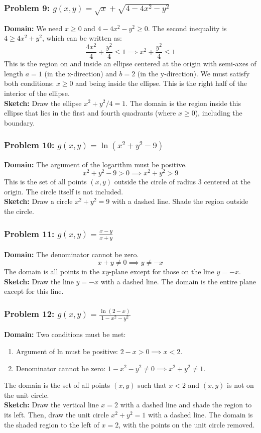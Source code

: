 \documentclass{article}
\begin{document}
\subsubsection{Problem 9: $g(x, y) = \sqrt{x} + \sqrt{4 - 4x^2 - y^2}$}
\textbf{Domain:} We need $x \ge 0$ and $4 - 4x^2 - y^2 \ge 0$.
The second inequality is $4 \ge 4x^2 + y^2$, which can be written as:
\[ \frac{4x^2}{4} + \frac{y^2}{4} \le 1 \implies x^2 + \frac{y^2}{4} \le 1 \]
This is the region on and inside an ellipse centered at the origin with semi-axes of length $a=1$ (in the x-direction) and $b=2$ (in the y-direction).
We must satisfy both conditions: $x \ge 0$ and being inside the ellipse. This is the right half of the interior of the ellipse. \\
\textbf{Sketch:} Draw the ellipse $x^2 + y^2/4 = 1$. The domain is the region inside this ellipse that lies in the first and fourth quadrants (where $x \ge 0$), including the boundary.

\subsubsection{Problem 10: $g(x, y) = \ln(x^2 + y^2 - 9)$}
\textbf{Domain:} The argument of the logarithm must be positive.
\[ x^2 + y^2 - 9 > 0 \implies x^2 + y^2 > 9 \]
This is the set of all points $(x, y)$ outside the circle of radius 3 centered at the origin. The circle itself is not included. \\
\textbf{Sketch:} Draw a circle $x^2+y^2=9$ with a dashed line. Shade the region outside the circle.

\subsubsection{Problem 11: $g(x, y) = \frac{x-y}{x+y}$}
\textbf{Domain:} The denominator cannot be zero.
\[ x + y \neq 0 \implies y \neq -x \]
The domain is all points in the $xy$-plane except for those on the line $y = -x$. \\
\textbf{Sketch:} Draw the line $y = -x$ with a dashed line. The domain is the entire plane except for this line.

\subsubsection{Problem 12: $g(x, y) = \frac{\ln(2-x)}{1 - x^2 - y^2}$}
\textbf{Domain:} Two conditions must be met:
\begin{enumerate}
    \item Argument of ln must be positive: $2-x > 0 \implies x < 2$.
    \item Denominator cannot be zero: $1 - x^2 - y^2 \neq 0 \implies x^2 + y^2 \neq 1$.
\end{enumerate}
The domain is the set of all points $(x, y)$ such that $x < 2$ and $(x, y)$ is not on the unit circle. \\
\textbf{Sketch:} Draw the vertical line $x=2$ with a dashed line and shade the region to its left. Then, draw the unit circle $x^2+y^2=1$ with a dashed line. The domain is the shaded region to the left of $x=2$, with the points on the unit circle removed.
\end{document}

